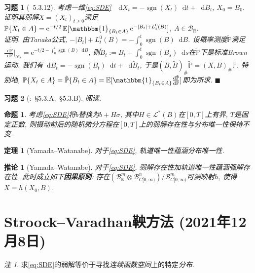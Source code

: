 \documentclass{ctexart}
\theoremstyle{definition}
\theoremstyle{remark}
\newtheorem{Rmk}[Def]{注}
\theoremstyle{plain}
\newtheorem{Prop}[Def]{命题}
\newtheorem{Thm}[Def]{定理}
\newtheorem{Cor}[Def]{推论}
\newtheorem{Ex}{习题}[section]
\newenvironment{Prf}{\vspace{1ex}\textbf{\\}{\color{red}\textit{证明}}.\normalfont}{\color{red}\hfill$\blacksquare$\vspace{1ex}\par}
\newcommand{\1}{\mathbbm{1}}				%
\renewcommand{\P}{\mathbb{P}}				%
\newcommand{\E}{\mathbb{E}}					%
\newcommand{\sgn}[1]{\operatorname{sgn}(#1)}	%
\newcommand{\abs}[1]{\lvert#1\rvert}			%
\newcommand{\R}{\mathbb{R}}					%
\renewcommand*{\d}{\mathop{}\!\mathrm{d}}	%
\newcommand{\e}{\mathrm{e}}
\begin{document}
\begin{Ex}[\cite{Karatzas-Shreve--GTM113}~5.3.12]
考虑一维\ref{eq:SDE}~$\d X_{t} = -\sgn{X_{t}} \d t + \d B_{t} ,~ X_{0} = B_{0}$. 证明其弱解$X = (X_{t})_{t \ge 0}$满足$\P\{ X_{t} \in A \} = \e^{-t/2} \, \E[\1_{\{ B_{t} \in A \}} \, \e^{-\abs{B_{t}}+L_{t}^{0}(B)}]$, $A \in \mathscr{B}_{\R}$.
\begin{Prf}
由Tanaka公式, $-\abs{B_{t}}+L_{t}^{0}(B) = -\int_{0}^{t} \sgn{B} \d B$. 设概率测度$\tilde{\P}$满足$\frac{\d\tilde{\P}}{\d\P}\big|_{\mathscr{F}_{t}} = \e^{-t/2 -\int_{0}^{t} \sgn{B} \d B}$, 则$\tilde{B}_{t} := B_{t} + \int_{0}^{t} \sgn{B_{s}} \d s$在$\tilde{\P}$下是标准Brown运动. 我们有$\d B_{t} = -\sgn{B_{t}} \d t + \d\tilde{B}_{t}$, 于是$(B,\tilde{B})_{\#}\tilde{\P} = (X,B)_{\#}\P$. 特别地, $\P\{ X_{t} \in A \} = \tilde{\P}\{ B_{t} \in A \} = \E[\1_{\{ B_{t} \in A \}} \frac{\d\tilde{\P}}{\d\P}]$即为所求.
\end{Prf}
\end{Ex}


\begin{Ex}[\cite{Karatzas-Shreve--GTM113}:~\S5.3.A,~\S5.3.B]
阅读.
\end{Ex}



\begin{Prop}
考虑\eqref{eq:SDE}将$b$替换为$b + H \sigma$, 其中$H \in \mathcal{L}^{*}(B)$在$[0,T]$上有界, $T$是固定正数, 则摄动前后的随机微分方程在$[0,T]$上的弱解存在性与分布唯一性保持不变.
\end{Prop}

\begin{Thm}[Yamada--Watanabe]
对于\eqref{eq:SDE}, 轨道唯一性蕴涵分布唯一性.
\end{Thm}
\begin{Cor}[Yamada--Watanabe]
对于\eqref{eq:SDE}, 弱解存在性加轨道唯一性蕴涵强解存在性. 此时成立如下\textbf{因果原则}: 存在$(\mathscr{B}_{\R}^{m}\otimes\mathscr{B}_{C[0,\infty)}^{n})/\mathscr{B}_{C[0,\infty)}^{m}$可测映射$h$, 使得$X = h(X_{0},B)$.
\end{Cor}


\section{Stroock--Varadhan鞅方法 \normalfont\footnotesize (2021年12月8日)}
\begin{Rmk}
求\eqref{eq:SDE}的弱解等价于寻找\emph{连续函数空间}上的特定\emph{分布}.
\end{Rmk}
\end{document}
